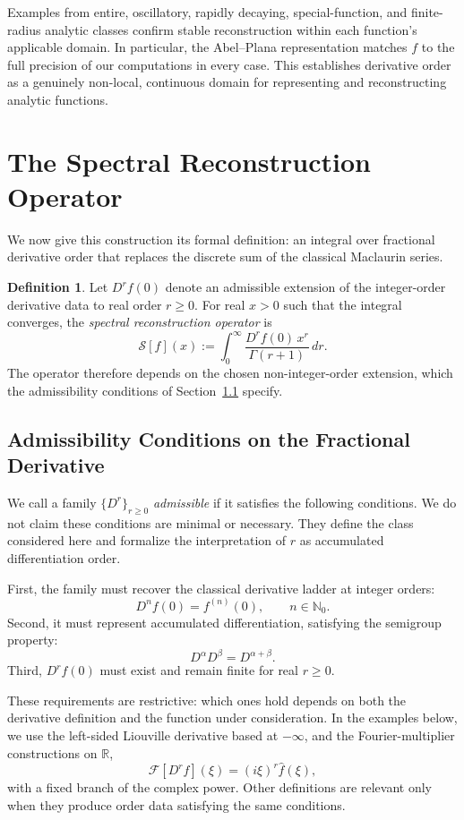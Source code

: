 \documentclass[preprint, 12pt]{elsarticle}
\theoremstyle{definition}
\newtheorem{definition}{Definition}[section]
\theoremstyle{plain}
\theoremstyle{remark}
\begin{document}
Examples from entire, oscillatory, rapidly decaying, special-function, and finite-radius analytic classes confirm stable reconstruction within each function's applicable domain. In particular, the Abel--Plana representation matches $f$ to the full precision of our computations in every case. This establishes derivative order as a genuinely non-local, continuous domain for representing and reconstructing analytic functions.

\section{The Spectral Reconstruction Operator}
\label{sec:operator}
We now give this construction its formal definition: an integral over fractional derivative order that replaces the discrete sum of the classical Maclaurin series.

\begin{definition}
Let $D^{r}f(0)$ denote an admissible extension of the integer-order derivative data to real order $r\geq 0$. For real $x>0$ such that the integral converges, the \textit{spectral reconstruction operator} is
\begin{equation}
\label{eq:operator_def}
\mathcal{S}[f](x)
:=
\int_{0}^{\infty}
\frac{D^{r}f(0)\,x^{r}}{\Gamma(r+1)}
\,dr.
\end{equation}
The operator therefore depends on the chosen non-integer-order extension, which the admissibility conditions of Section~\ref{sub:frac_deriv_admissibility} specify.
\end{definition}

\subsection{Admissibility Conditions on the Fractional Derivative}
\label{sub:frac_deriv_admissibility}
We call a family $\{D^r\}_{r\ge0}$ \emph{admissible} if it satisfies the following conditions. We do not claim these conditions are minimal or necessary. They define the class considered here and formalize the interpretation of $r$ as accumulated differentiation order.

First, the family must recover the classical derivative ladder at integer orders:
\[
D^n f(0)=f^{(n)}(0),
\qquad n\in\mathbb N_0.
\]
Second, it must represent accumulated differentiation, satisfying the semigroup property:
\[
D^\alpha D^\beta = D^{\alpha+\beta}.
\]
Third, $D^r f(0)$ must exist and remain finite for real $r\geq 0$.

These requirements are restrictive: which ones hold depends on both the derivative definition and the function under consideration. In the examples below, we use the left-sided Liouville derivative based at $-\infty$, and the Fourier-multiplier constructions on $\mathbb R$,
\begin{equation}
\label{eq:liouville_fourier}
\mathcal F[D^r f](\xi)
=
(i\xi)^r\widehat f(\xi),
\end{equation}
with a fixed branch of the complex power. Other definitions are relevant only when they produce order data satisfying the same conditions.
\end{document}
